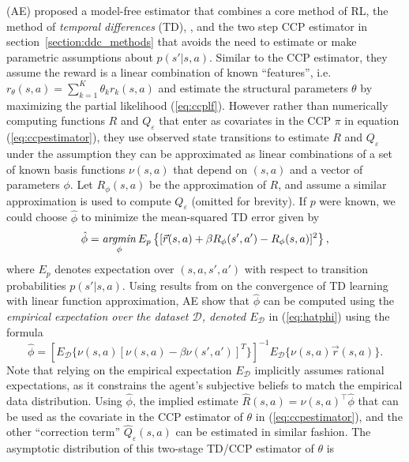 \citet{AE:2022} (AE) proposed a model-free estimator that combines a core method of RL, the method of {\it temporal differences\/} (TD),
\citet{BartoSutton:2020}, and the two step \citet{hotzmiller:1993} CCP estimator in
section~\ref{section:ddc_methods} that avoids the need to estimate or make parametric assumptions about $p(s'|s,a)$. Similar to the CCP estimator, they
assume the reward is a linear combination of known ``features'', i.e. $r_\theta(s,a)=\sum_{k=1}^K \theta_k r_k(s,a)$
and  estimate the structural parameters $\theta$ by maximizing the partial likelihood (\ref{eq:ccplf}). 
However rather than numerically computing functions $R$ and $Q_\varepsilon$ that
enter as covariates in the CCP $\pi$ in equation (\ref{eq:ccpestimator}), they use observed state transitions
to estimate  $R$ and $Q_\varepsilon$ under the assumption they can be approximated as linear
combinations of a set of known basis functions $\nu(s,a)$ that depend on $(s,a)$ and a vector of parameters $\phi$. Let $R_\phi(s,a)$
be the approximation of $R$, and assume a similar approximation is used to compute $Q_\varepsilon$ (omitted for brevity).
If $p$ were known, we could choose $\hat\phi$ to minimize the mean-squared TD error given by
\begin{equation}
     \hat\phi =\mathop{\it argmin}_\phi E_p\left\{ [\vec{r}(s,a)+\beta R_\phi(s',a')-R_\phi(s,a)]^2\right\},
\label{eq:hatphi}
\end{equation}
where $E_p$ denotes expectation over $(s,a,s',a')$ with respect to transition probabilities $p(s'|s,a)$.
Using results from \citet{TsitsiklisVanRoy:1997} on the convergence of TD learning with linear function approximation, 
AE show that $\hat\phi$ can be computed using the {\it empirical expectation over the dataset $\mathcal{D}$, denoted $E_{\mathcal{D}}$\/} in (\ref{eq:hatphi})
using the formula
\begin{equation}
     \hat\phi = \left[E_{\mathcal{D}}\{\nu(s,a)[\nu(s,a)-\beta\nu(s',a')]^{{\scriptscriptstyle T}}\}\right]^{-1} E_{\mathcal{D}}\{\nu(s,a)\vec{r}(s,a)\}.
\label{eq:QR_regression}
\end{equation}
Note that relying on the empirical expectation $E_{\mathcal{D}}$ implicitly assumes rational expectations, as it constrains the agent's subjective beliefs to match the empirical data distribution.
Using $\hat\phi$, the implied estimate $\hat R(s,a)=\nu(s,a)^\top\hat\phi$ that can be used as the covariate 
in the CCP estimator of  $\theta$ in (\ref{eq:ccpestimator}), and the other ``correction term''  $\hat Q_\varepsilon(s,a)$
can be estimated in similar fashion. The asymptotic distribution of this two-stage TD/CCP estimator of $\theta$  is 
